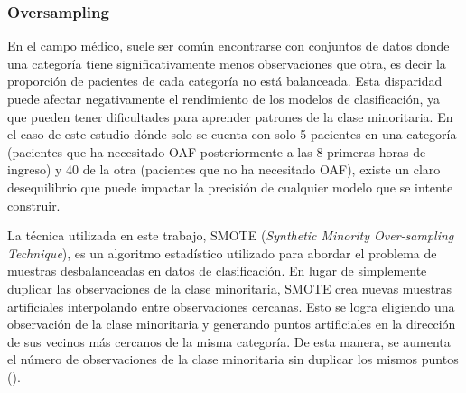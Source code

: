 \subsubsection{Oversampling}\label{sec:oversampling}

En el campo médico, suele ser común encontrarse con conjuntos de datos donde una categoría tiene significativamente menos observaciones que otra, es decir la proporción de pacientes de cada categoría no está balanceada. Esta disparidad puede afectar negativamente el rendimiento de los modelos de clasificación, ya que pueden tener dificultades para aprender patrones de la clase minoritaria. En el caso de este estudio dónde solo se cuenta con solo 5 pacientes en una categoría (pacientes que ha necesitado OAF posteriormente a las $8$ primeras horas de ingreso) y 40  de la  otra (pacientes que no ha necesitado OAF), existe un claro desequilibrio que puede impactar la precisión de cualquier modelo que se intente construir.

La técnica utilizada en este trabajo, SMOTE (\textit{Synthetic Minority Over-sampling Technique}), es un algoritmo estadístico utilizado para abordar el problema de muestras desbalanceadas en datos de clasificación. En lugar de simplemente duplicar las observaciones de la clase minoritaria, SMOTE crea nuevas muestras artificiales interpolando entre observaciones cercanas. Esto se logra eligiendo una observación de la clase minoritaria y generando puntos artificiales en la dirección de sus vecinos más cercanos de la misma categoría. De esta manera, se aumenta el número de observaciones de la clase minoritaria sin duplicar los mismos puntos (\cite{Chawla2002}).
\newpage


\newpage



\newpage